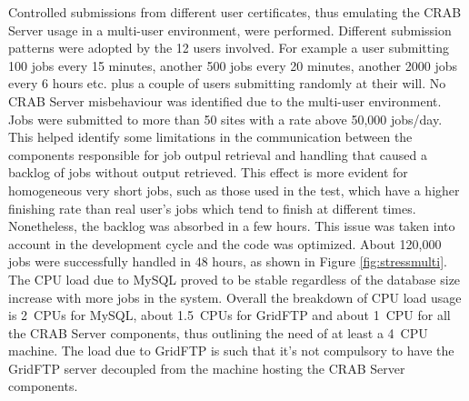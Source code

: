 Controlled submissions from different user certificates, thus 
emulating the CRAB Server usage in a multi-user environment, were performed.
Different submission patterns were adopted by the 12 users
involved. For example a user submitting 100 jobs every 15 minutes,
another 500 jobs every 20 minutes, another 2000 jobs every 6 hours
etc. plus a couple of users submitting randomly at their will.  No
CRAB Server misbehaviour was identified due to the multi-user
environment. %
Jobs were submitted to more than 50 sites with a rate above 50,000 jobs/day.
This helped identify some limitations in the communication between 
the components responsible for job outpul retrieval and handling that caused a backlog of jobs without output retrieved. This effect is more evident for homogeneous very short
jobs, such as those used in the test, which have a higher finishing rate
than real user's jobs which tend to finish at different times. Nonetheless, the backlog was absorbed in a few hours. This issue was
taken into account in the development cycle and the code was
optimized.  About 120,000 jobs were successfully handled in 48 hours,
as shown in Figure \ref{fig:stressmulti}.  The CPU load due to MySQL
proved to be stable regardless of the database size increase with more
jobs in the system. Overall the breakdown of CPU load usage is 2~CPUs
for MySQL, about 1.5~CPUs for GridFTP and about 1~CPU for all the CRAB
Server components, thus outlining the need of at least a 4~CPU
machine.  The load due to GridFTP is such that it's not compulsory to
have the GridFTP server decoupled from the machine hosting the CRAB
Server components.

